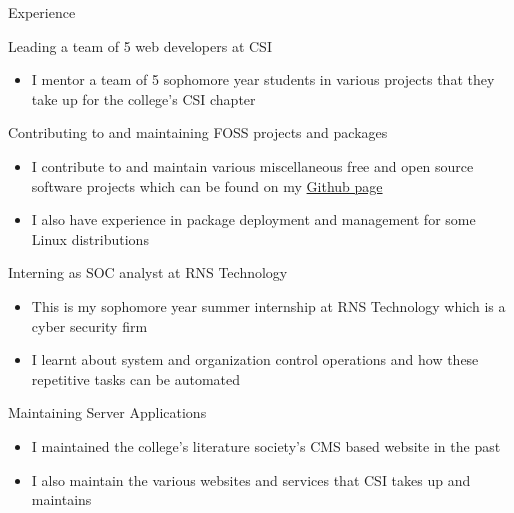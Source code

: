 \documentclass{article}
\newlength{\tabin}
\newlength{\secsep}
\newcommand{\lineunder}{\vspace*{-8pt} \\ \hspace*{-6pt} \hrulefill \\ \vspace*{-15pt}}
\newenvironment{tabbedsection}[1]{
	\begin{list}{}{
		\setlength{\itemsep}{0pt}
		\setlength{\labelsep}{0pt}
		\setlength{\labelwidth}{0pt}
		\setlength{\leftmargin}{\tabin}
		\setlength{\rightmargin}{\tabin}
		\setlength{\listparindent}{0pt}
		\setlength{\parsep}{0pt}
		\setlength{\parskip}{0pt}
		\setlength{\partopsep}{0pt}
		\setlength{\topsep}{#1}
	}
	\item[]
}{\end{list}}
\newenvironment{resume_section}[1]{
	\filbreak
	\vspace{2\secsep}
	\textsc{\large#1}
	\lineunder
	\begin{tabbedsection}{\secsep}
}{\end{tabbedsection}}
\newenvironment{resume_subsection}[2][]{
	\textbf{#2} \hfill {\footnotesize #1} \hspace{2em}
	\begin{tabbedsection}{0.5\secsep}
}{\end{tabbedsection}}
\newenvironment{subitems}{
	\renewcommand{\labelitemi}{-}
	\begin{itemize}
		\setlength{\labelsep}{1em}
}{\end{itemize}}
\begin{document}
\begin{resume_section}{Experience}
	\begin{resume_subsection}{Leading a team of 5 web developers at CSI}
		\begin{subitems}
		\item I mentor a team of 5 sophomore year students in various
			projects that they take up for the college's CSI
			chapter
		\end{subitems}
	\end{resume_subsection}

	\begin{resume_subsection}{Contributing to and maintaining FOSS projects and packages}
		\begin{subitems}
		\item I contribute to and maintain various miscellaneous free
			and open source software projects which can be found on
			my \href{https://github.com/nimaipatel}{Github page}
		\item I also have experience in package deployment and
			management for some Linux distributions
		\end{subitems}
	\end{resume_subsection}

	\begin{resume_subsection}{Interning as SOC analyst at RNS Technology}
		\begin{subitems}
		\item This is my sophomore year summer internship at RNS Technology
			which is a cyber security firm
		\item I learnt about system and organization control operations and
			how these repetitive tasks can be automated
		\end{subitems}
	\end{resume_subsection}

	\begin{resume_subsection}{Maintaining Server Applications}
		\begin{subitems}
			\item I maintained the college's literature society's
				CMS based website in the past
			\item I also maintain the various websites and services
				that CSI takes up and maintains
		\end{subitems}
	\end{resume_subsection}

\end{resume_section}
\end{document}
